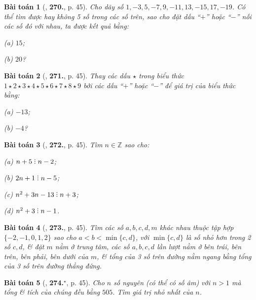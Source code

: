 \documentclass{article}
\numberwithin{equation}{section}
\newtheorem{baitoan}{Bài toán}
\DeclareRobustCommand{\divby}{%
	\mathrel{\vbox{\baselineskip.65ex\lineskiplimit0pt\hbox{.}\hbox{.}\hbox{.}}}%
}
\begin{document}
\begin{baitoan}[\cite{Binh_Toan_6_tap_1}, \textbf{270.}, p. 45]
	Cho dãy số $1,-3,5,-7,9,-11,13,-15,17,-19$. Có thể tìm được hay không 5 số trong các số trên, sao cho đặt dấu ``$+$'' hoặc ``$-$'' nối các số đó với nhau, ta được kết quả bằng:
	\begin{enumerate*}
		\item[(a)] $15$;
		\item[(b)] $20$?
	\end{enumerate*}
\end{baitoan}

\begin{baitoan}[\cite{Binh_Toan_6_tap_1}, \textbf{271.}, p. 45]
	Thay các dấu  $\star$ trong biểu thức $1\star2\star3\star4\star5\star6\star7\star8\star9$ bởi các dấu ``$+$'' hoặc ``$-$'' để giá trị của biểu thức bằng:
	\begin{enumerate*}
		\item[(a)] $-13$;
		\item[(b)] $-4$?
	\end{enumerate*}
\end{baitoan}

\begin{baitoan}[\cite{Binh_Toan_6_tap_1}, \textbf{272.}, p. 45]
	Tìm $n\in\mathbb{Z}$ sao cho:
	\begin{enumerate*}
		\item[(a)] $n + 5\divby n - 2$;
		\item[(b)] $2n + 1\divby n - 5$;
		\item[(c)] $n^2 + 3n - 13\divby n + 3$;
		\item[(d)] $n^2 + 3\divby n - 1$.
	\end{enumerate*}
\end{baitoan}

\begin{baitoan}[\cite{Binh_Toan_6_tap_1}, \textbf{273.}, p. 45]
	Tìm các số $a,b,c,d,m$ khác nhau thuộc tập hợp $\{-2,-1,0,1,2\}$ sao cho $a < b < \min\{c,d\}$, với $\min\{c,d\}$ là số nhỏ hơn trong 2 số $c,d$, \& đặt $m$ nằm ở trung tâm, các số $a,b,c,d$ lần lượt nằm ở bên trái, bên trên, bên phải, bên dưới của $m$, \& tổng của 3 số trên đường nằm ngang bằng tổng của 3 số trên đường thẳng đứng.
\end{baitoan}

\begin{baitoan}[\cite{Binh_Toan_6_tap_1}, \textbf{274.}${}^\star$, p. 45]
	Cho $n$ số nguyên (có thể có số âm) với $n > 1$ mà tổng \& tích của chúng đều bằng $505$. Tìm giá trị nhỏ nhất của $n$.
\end{baitoan}
\end{document}
